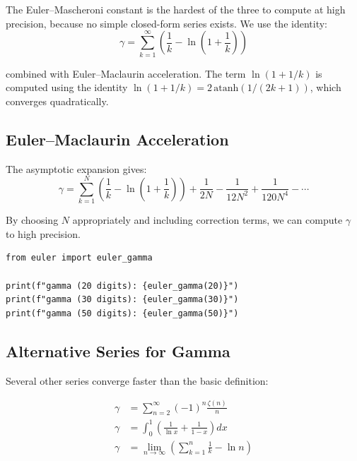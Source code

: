 The Euler--Mascheroni constant is the hardest of the three to compute at high precision,
because no simple closed-form series exists. We use the identity:
\[
\gamma = \sum_{k=1}^{\infty} \left(\frac{1}{k} - \ln\left(1 + \frac{1}{k}\right)\right)
\]

combined with Euler--Maclaurin acceleration. The term $\ln(1+1/k)$ is computed using
the identity $\ln(1+1/k) = 2\,\mathrm{atanh}(1/(2k+1))$, which converges quadratically.

\subsection{Euler--Maclaurin Acceleration}

The asymptotic expansion gives:
\[
\gamma = \sum_{k=1}^{N} \left(\frac{1}{k} - \ln\left(1 + \frac{1}{k}\right)\right) + \frac{1}{2N} - \frac{1}{12N^2} + \frac{1}{120N^4} - \cdots
\]

By choosing $N$ appropriately and including correction terms, we can compute $\gamma$ to high precision.

\begin{lstlisting}[caption={Computing gamma}, label=lst:compute_gamma]
from euler import euler_gamma

print(f"gamma (20 digits): {euler_gamma(20)}")
print(f"gamma (30 digits): {euler_gamma(30)}")
print(f"gamma (50 digits): {euler_gamma(50)}")
\end{lstlisting}

\subsection{Alternative Series for Gamma}

Several other series converge faster than the basic definition:

\begin{align*}
\gamma &= \sum_{n=2}^{\infty} (-1)^n \frac{\zeta(n)}{n} \\
\gamma &= \int_0^1 \left(\frac{1}{\ln x} + \frac{1}{1-x}\right) dx \\
\gamma &= \lim_{n \to \infty} \left(\sum_{k=1}^n \frac{1}{k} - \ln n\right)
\end{align*}

